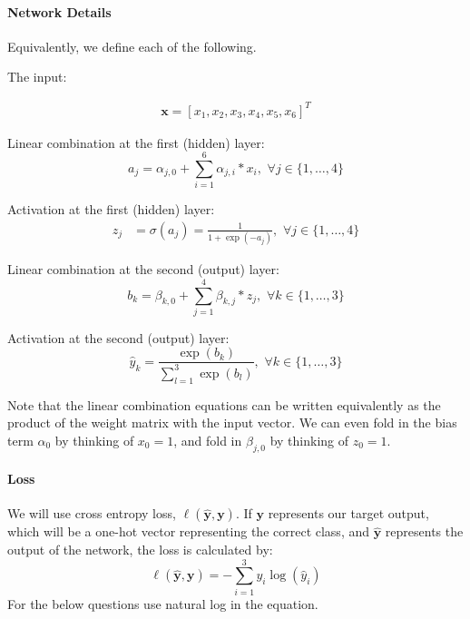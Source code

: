 \documentclass[11pt]{exam}
\numberwithin{equation}{section} %
\numberwithin{figure}{section} %
\numberwithin{table}{section} %
\newcommand{\xv}{\mathbf{x}}
\newcommand{\yv}{\mathbf{y}}
\begin{document}
\paragraph{Network Details}

Equivalently, we define each of the following. 

The input:

\begin{align}
\xv=[x_1,x_2,x_3,x_4,x_5,x_6]^T
\end{align}

Linear combination at the first (hidden) layer:
\begin{equation}
a_j= \alpha_{j,0} + \sum_{i=1}^6 \alpha_{j,i}*x_i,\,\, \forall j \in \{1,\ldots,4\}
\end{equation}

Activation at the first (hidden) layer:
\begin{align}
z_j &= \sigma(a_j) = \frac{1}{1+\exp(-a_j)},\,\, \forall j \in \{1,\ldots,4\}
\end{align}

Linear combination at the second (output) layer:
\begin{equation}
b_k = \beta_{k,0} + \sum_{j=1}^4 \beta_{k,j}*z_j,\,\, \forall k \in \{1,\ldots,3\}
\end{equation}

Activation at the second (output) layer:
\begin{equation}
\hat{y}_k = \frac{\exp(b_k)}{\sum\limits_{l=1}^3 \exp(b_l)},\,\, \forall k \in \{1,\ldots,3\}
\end{equation}

Note that the linear combination equations can be written equivalently as the product of the weight matrix with the input vector. We can even fold in the bias term $\alpha_0$ by thinking of $x_0 = 1$, and fold in $\beta_{j,0}$ by thinking of $z_0 = 1$.

\paragraph{Loss}

We will use cross entropy loss, $\ell(\hat{\yv},\yv)$. If $\yv$ represents our target output, which will be a one-hot vector representing the correct class, and $\hat{\yv}$ represents the output of the network, the loss is calculated by:
\begin{equation}
   \ell(\hat{\yv},\yv) = - \sum_{i=1}^3 y_i \log(\hat{y}_i)
\end{equation}
For the below questions use natural log in the equation.
\end{document}
